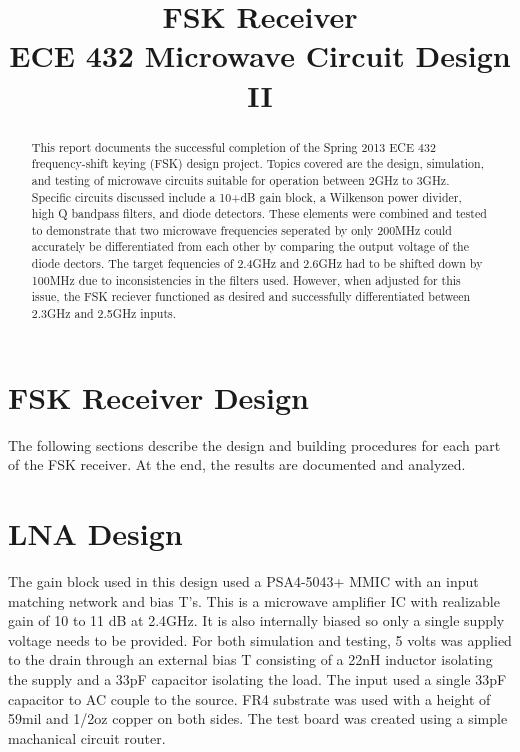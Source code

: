 \documentclass[conference]{IEEEtran}
\begin{document}
\title{FSK Receiver\\ECE 432 Microwave Circuit Design II}
\author{
}
\maketitle
\IEEEpeerreviewmaketitle
\begin{abstract}
This report documents the successful completion of the Spring 2013 ECE 432 frequency-shift keying (FSK) design project. Topics covered are the design, simulation, and testing of microwave circuits suitable for operation between 2GHz to 3GHz. Specific circuits discussed include a 10+dB gain block, a Wilkenson power divider, high Q bandpass filters, and diode detectors. These elements were combined and tested to demonstrate that two microwave frequencies seperated by only 200MHz could accurately be differentiated from each other by comparing the output voltage of the diode dectors. The target fequencies of 2.4GHz and 2.6GHz had to be shifted down by 100MHz due to inconsistencies in the filters used. However, when adjusted for this issue, the FSK reciever functioned as desired and successfully differentiated between 2.3GHz and 2.5GHz inputs.
\end{abstract}
\section{FSK Receiver Design}
The following sections describe the design and building procedures for each part of the FSK receiver.  At the end, the results are documented and analyzed.


\section{LNA Design}
The gain block used in this design used a PSA4-5043+ MMIC with an input matching network and bias T's. This is a microwave amplifier IC with realizable gain of 10 to 11 dB at 2.4GHz. It is also internally biased so only a single supply voltage needs to be provided. For both simulation and testing, 5 volts was applied to the drain through an external bias T consisting of a 22nH inductor isolating the supply and a 33pF capacitor isolating the load. The input used a single 33pF capacitor to AC couple to the source. FR4 substrate was used with a height of 59mil and 1/2oz copper on both sides. The test board was created using a simple machanical circuit router. 
\end{document}
